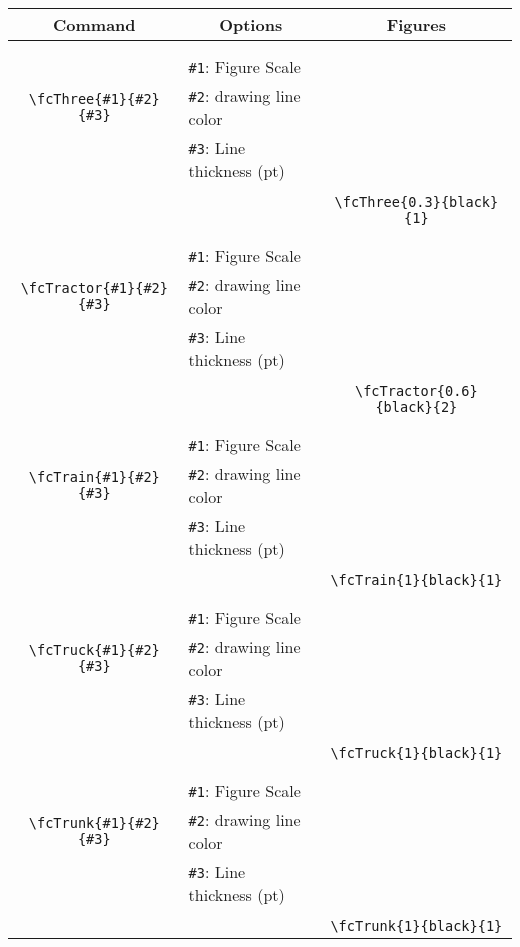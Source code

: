 \documentclass{article}
\begin{document}
\begin{table}[H]\centering\begin{tabular}{|c|l|c|}\hline {\bf Command}& \multicolumn{1}{c|}{{\bf Options}} & {\bf Figures}\\  \hline	&&\multirow{5}{*}{\fcThree{0.3}{black}{1}}\\	&&\\	&\verb|#1|: Figure Scale &\\	\verb|\fcThree{#1}{#2}{#3}|&	\verb|#2|: drawing line color &\\	&\verb|#3|: Line thickness (pt) &\\ &&\\&&	\verb|\fcThree{0.3}{black}{1}|\\\hline 	
	&&\multirow{5}{*}{\fcTractor{0.6}{black}{2}}\\	&&\\	&\verb|#1|: Figure Scale &\\	\verb|\fcTractor{#1}{#2}{#3}|&	\verb|#2|: drawing line color &\\	&\verb|#3|: Line thickness (pt) &\\ &&\\&&	\verb|\fcTractor{0.6}{black}{2}|\\\hline 	
	&&\multirow{5}{*}{\fcTrain{1}{black}{1}}\\	&&\\	&\verb|#1|: Figure Scale &\\	\verb|\fcTrain{#1}{#2}{#3}|&	\verb|#2|: drawing line color &\\	&\verb|#3|: Line thickness (pt) &\\ &&\\&&	\verb|\fcTrain{1}{black}{1}|\\\hline 	
	&&\multirow{5}{*}{\fcTruck{1}{black}{1}}\\	&&\\	&\verb|#1|: Figure Scale &\\	\verb|\fcTruck{#1}{#2}{#3}|&	\verb|#2|: drawing line color &\\	&\verb|#3|: Line thickness (pt) &\\ &&\\&&	\verb|\fcTruck{1}{black}{1}|\\\hline 	
	&&\multirow{5}{*}{\fcTrunk{1}{black}{1}}\\	&&\\	&\verb|#1|: Figure Scale &\\	\verb|\fcTrunk{#1}{#2}{#3}|&	\verb|#2|: drawing line color &\\	&\verb|#3|: Line thickness (pt) &\\ &&\\&&	\verb|\fcTrunk{1}{black}{1}|\\\hline 	

\end{tabular}
\end{table}
\end{document}
